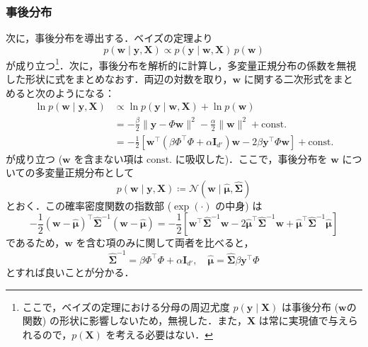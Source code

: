 \documentclass[titlepage]{ltjsbook}
\begin{document}
\subsubsection{事後分布}
次に，事後分布を導出する．ベイズの定理より
\begin{equation}
p(\mathbf{w}\mid \mathbf{y},\mathbf{X}) \propto p(\mathbf{y}\mid \mathbf{w},\mathbf{X})\,p(\mathbf{w})
\end{equation}
が成り立つ\footnote{ここで，ベイズの定理における分母の周辺尤度 $p(\mathbf{y}\mid\mathbf{X})$ は事後分布 ($\mathbf{w}$の関数) の形状に影響しないため，無視した．また，$\mathbf{X}$ は常に実現値で与えられるので，$p(\mathbf{X})$ を考える必要はない．}．次に，事後分布を解析的に計算し，多変量正規分布の係数を無視した形状に式をまとめなおす．両辺の対数を取り，$\mathbf{w}$ に関する二次形式をまとめると次のようになる：
\begin{align}
\ln p(\mathbf{w}\mid \mathbf{y},\mathbf{X})
&\propto \ln p(\mathbf{y}\mid \mathbf{w},\mathbf{X}) + \ln p(\mathbf{w}) \\
&= -\frac{\beta}{2}\lVert \mathbf{y}-\Phi\mathbf{w}\rVert^2 -\frac{\alpha}{2}\lVert \mathbf{w}\rVert^2 + \text{const.}\\
&=-\frac{1}{2}\left[\mathbf{w}^\top\left(\beta\Phi^\top\Phi+\alpha\mathbf{I}_{d'}\right)\mathbf{w}-2\beta\mathbf{y}^\top\Phi\mathbf{w}\right]+ \text{const.}
\end{align}
が成り立つ ($\mathbf{w}$ を含まない項は $\mathrm{const.}$ に吸収した)．ここで，事後分布を $\mathbf{w}$ についての多変量正規分布として
\begin{equation}
p(\mathbf{w} \mid \mathbf{y}, \mathbf{X}) \coloneq \mathcal{N}(\mathbf{w}\mid \hat{\boldsymbol{\mu}}, \hat{\boldsymbol{\Sigma}})
\end{equation}
とおく．この確率密度関数の指数部 ($\exp(\cdot)$ の中身) は
\begin{equation}
-\frac{1}{2}(\mathbf{w}-\hat{\boldsymbol{\mu}})^\top \hat{\boldsymbol{\Sigma}}^{-1} (\mathbf{w}-\hat{\boldsymbol{\mu}})
= -\frac{1}{2}\left[\mathbf{w}^\top \hat{\boldsymbol{\Sigma}}^{-1} \mathbf{w}
- 2 \hat{\boldsymbol{\mu}}^\top \hat{\boldsymbol{\Sigma}}^{-1} \mathbf{w}
+ \hat{\boldsymbol{\mu}}^\top \hat{\boldsymbol{\Sigma}}^{-1} \hat{\boldsymbol{\mu}}\right]
\end{equation}
であるため，$\mathbf{w}$ を含む項のみに関して両者を比べると，
\begin{equation}
\hat{\boldsymbol{\Sigma}}^{-1}=\beta\Phi^\top\Phi+\alpha\mathbf{I}_{d'},\quad \hat{\boldsymbol{\mu}}=\hat{\boldsymbol{\Sigma}}\beta\mathbf{y}^\top\Phi
\end{equation}
とすれば良いことが分かる．
\end{document}
